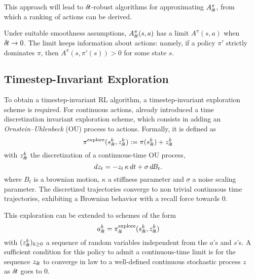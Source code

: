 This approach will lead to ${\delta\hspace{-.1em}t}$-robust algorithms for
approximating $A^\pi_{\delta\hspace{-.1em}t}$, from which a ranking of actions can be
derived.

\begin{theorem}
Under suitable smoothness assumptions, $A^\pi_{\delta\hspace{-.1em}t}(s,a)$ has a limit
$A^\pi(s,a)$ when ${\delta\hspace{-.1em}t}\to 0$. The limit keeps information about
actions: namely, if a policy $\pi'$ strictly dominates $\pi$, 
then
$A^\pi(s,\pi'(s))>0$ for some state $s$.
\end{theorem}

\subsection{Timestep-Invariant Exploration}
\label{subsec:explo}

To obtain a timestep-invariant RL algorithm, a timestep-invariant
exploration scheme is required. 
For continuous actions, \cite{ddpg} already introduced a time discretization invariant exploration scheme, which consists in adding an
\emph{Ornstein--Uhlenbeck} \cite{orn-uhl} (OU) process to actions. Formally, it is defined as
\begin{equation}
	\pi^\text{explore}(s^k_{\delta\hspace{-.1em}t}, z^k_{\delta\hspace{-.1em}t}) \mathrel{\mathop{:}}= \pi(s^k_{\delta\hspace{-.1em}t}) + z^k_{\delta\hspace{-.1em}t}
\end{equation}
with $z^k_{\delta\hspace{-.1em}t}$ the discretization of a continuous-time OU process,
\begin{equation}
	dz_t = - z_t \,\kappa\, dt + \sigma \,d\hspace{-.1em}B_t.
	\label{eq:orn_uhl}
\end{equation}
where $B_t$ is a brownian motion, $\kappa$ a stiffness parameter and
$\sigma$ a noise scaling parameter. The discretized trajectories converge
to non trivial continuous time trajectories, exhibiting a Brownian
behavior with a recall force towards $0$.

This exploration can be extended to schemes of the form
\begin{equation}
  \label{eq:explore}
	a^k_{\delta\hspace{-.1em}t} = \pi^\text{explore}_{\delta\hspace{-.1em}t}(s^k_{\delta\hspace{-.1em}t}, z^k_{\delta\hspace{-.1em}t})
\end{equation}
with $(z^k_{\delta\hspace{-.1em}t})_{k\geq 0}$ a sequence of random variables independent from the $a$'s and $s$'s.
A sufficient condition for this policy to admit a continuous-time
limit is for the sequence
$z_{\delta\hspace{-.1em}t}$ to converge in law to a
well-defined continuous stochastic process $z$ as ${\delta\hspace{-.1em}t}$ goes to $0$.


